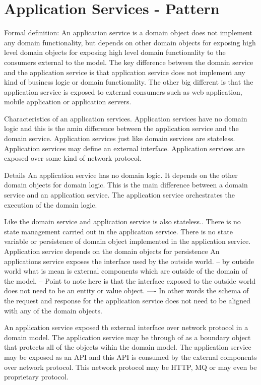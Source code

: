 \documentclass[a4paper, 11pt]{book}
\begin{document}
    \section{Application Services - Pattern}
    Formal definition:
    An application service is a domain object does not implement any domain functionality, but depends on other domain objects for exposing high level domain objects for exposing high level domain functionality to the consumers external to the model.
    The key difference between the domain service and the application service is that application service does not implement any kind of business logic or domain functionality.
    The other big different is that the application service is exposed to external consumers such as web application, mobile application or application servers.

    Characteristics of an application services.
    Application services have no domain logic and this is the amin difference between the application service and the domain service.
    Application services just like domain services are stateless.
    Application services may define an external interface.
    Application services are exposed over some kind of network protocol.

    Details
    An application service has no domain logic. It depends on the other domain objects for domain logic.
    This is the main difference between a domain service and an application service.
    The application service orchestrates the execution of the domain logic.

    Like the domain service and application service is also stateless..
    There is no state management carried out in the application service.
    There is no state variable or persistence of domain object implemented in the application service.
    Application service depends on the domain objects for persistence
    An applications service exposes the interface used by the outside world.
    -- by outside world what is mean is external components which are outside of the domain of the model.
    -- Point to note here is that the interface exposed to the outside world does not need to be an entity or value object.
    ---- In other words the schema of the request and response for the application service does not need to be aligned with any of the domain objects.

    An application service exposed th external interface over network protocol in a domain model.
    The application service may be through of as a boundary object that protects all of the objects wihin the domain model.
    The application service may be exposed as an API and this API is consumed by the external components over network protocol.
    This network protocol may be HTTP, MQ or may even be proprietary protocol.
\end{document}
